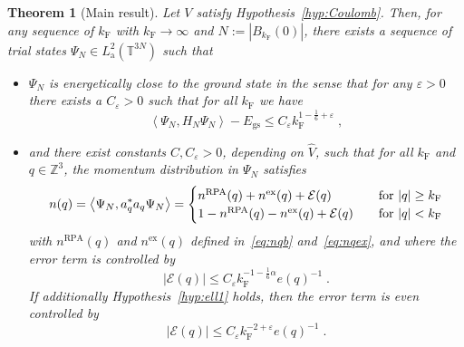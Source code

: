 \documentclass[12pt,a4paper]{article}
\numberwithin{equation}{section}
\newcommand{\cE}{\mathcal{E}}
\newcommand{\1}{\mathbb{I}}
\newcommand{\ex}{\mathrm{ex}}
\newcommand{\F}{\mathrm{F}}
\newcommand{\GS}{\mathrm{gs}}
\newcommand{\RPA}{\mathrm{RPA}}
\newcommand{\Z}{\mathbb{Z}}
\newcommand{\T}{\mathbb{T}}
\newcommand{\eva}[1]{\left\langle #1 \right\rangle}
\theoremstyle{plain}
\newtheorem{theorem}{Theorem}[section]
\theoremstyle{definition}
\theoremstyle{remark}
\theoremstyle{plain}
\theoremstyle{definition}
\theoremstyle{remark}
\begin{document}
\begin{theorem}[Main result] \label{thm:main}
Let $ V $ satisfy Hypothesis~\ref{hyp:Coulomb}. Then, for any sequence of $ k_{\F} $ with $ k_{\F} \to \infty $ and $ N := |B_{k_{\F}}(0)| $, there exists a sequence of trial states  $ \Psi_N \in L^2_{\mathrm{a}}(\T^{3N}) $ such that
\begin{itemize}
\item $ \Psi_N $ is energetically close to the ground state in the sense that for any $ \varepsilon > 0 $ there exists a $ C_\varepsilon > 0 $ such that for all $k_\F$ we have
\begin{equation} \label{eq:main1}
	\eva{\Psi_N, H_N \Psi_N} - E_{\GS}
	\le C_\varepsilon k_{\F}^{1-\frac 16 + \varepsilon} \;,
\end{equation}
\item and there exist constants $ C, C_\varepsilon > 0 $, depending on $ \hat{V} $, such that for all $ k_{\F} $ and $ q \in \Z^3 $, the momentum distribution in $ \Psi_N $ satisfies
\begin{equation} \label{eq:main2}
	n(q) = \eva{\Psi_N, a_q^* a_q \Psi_N}
	= \begin{cases}
	n^{\RPA}(q) + n^{\ex}(q) + \cE(q) & \quad
		\textnormal{for } |q| \ge k_{\F} \\
	1 - n^{\RPA}(q) - n^{\ex}(q) + \cE(q) & \quad
		\textnormal{for } |q| < k_{\F} 
	\end{cases}
\end{equation}
with $ n^{\RPA}(q) $ and $ n^{\ex}(q) $ defined in~\eqref{eq:nqb} and~\eqref{eq:nqex}, and where the error term is controlled by
\begin{equation}
	\lvert \cE(q)\rvert \le C_\varepsilon k_{\F}^{-1 - \frac 16 \alpha} e(q)^{-1} \;.
\end{equation}
If additionally Hypothesis~\ref{hyp:ell1} holds, then the error term is even controlled by
\begin{equation} \label{eq:main_improvederror}
	\lvert \cE(q)\rvert \le C_\varepsilon k_{\F}^{-2 +\varepsilon} e(q)^{-1} \;.
\end{equation}
\end{itemize}
\end{theorem}
\end{document}
